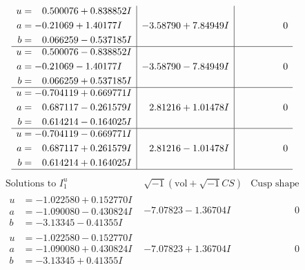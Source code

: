 \documentclass[1p]{elsarticle_modified}
\theoremstyle{definition}
\newcommand{\I}{\sqrt{-1}}
\begin{document}
$$\begin{array}{c|c|c}
\begin{aligned}
u &= \phantom{-}0.500076 + 0.838852 I \\
a &= -0.21069 + 1.40177 I \\
b &= \phantom{-}0.066259 - 0.537185 I\end{aligned}
 & -3.58790 + 7.84949 I & \phantom{-0.000000 } 0 \\ \hline\begin{aligned}
u &= \phantom{-}0.500076 - 0.838852 I \\
a &= -0.21069 - 1.40177 I \\
b &= \phantom{-}0.066259 + 0.537185 I\end{aligned}
 & -3.58790 - 7.84949 I & \phantom{-0.000000 } 0 \\ \hline\begin{aligned}
u &= -0.704119 + 0.669771 I \\
a &= \phantom{-}0.687117 - 0.261579 I \\
b &= \phantom{-}0.614214 - 0.164025 I\end{aligned}
 & \phantom{-}2.81216 + 1.01478 I & \phantom{-0.000000 } 0 \\ \hline\begin{aligned}
u &= -0.704119 - 0.669771 I \\
a &= \phantom{-}0.687117 + 0.261579 I \\
b &= \phantom{-}0.614214 + 0.164025 I\end{aligned}
 & \phantom{-}2.81216 - 1.01478 I & \phantom{-0.000000 } 0\\
 \hline 
 \end{array}$$\newpage$$\begin{array}{c|c|c}  
\text{Solutions to }I^u_{1}& \I (\text{vol} + \sqrt{-1}CS) & \text{Cusp shape}\\
 \hline 
\begin{aligned}
u &= -1.022580 + 0.152770 I \\
a &= -1.090080 - 0.430824 I \\
b &= -3.13345 - 0.41355 I\end{aligned}
 & -7.07823 - 1.36704 I & \phantom{-0.000000 } 0 \\ \hline\begin{aligned}
u &= -1.022580 - 0.152770 I \\
a &= -1.090080 + 0.430824 I \\
b &= -3.13345 + 0.41355 I\end{aligned}
 & -7.07823 + 1.36704 I & \phantom{-0.000000 } 0 \\ \hline\begin{aligned}

\end{aligned}
\end{array}$$
\end{document}

